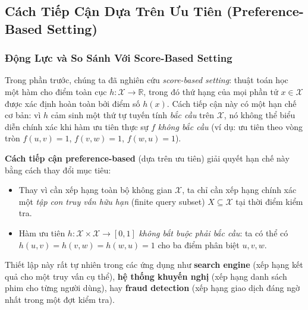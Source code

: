 
\subsection{Cách Tiếp Cận Dựa Trên Ưu Tiên (Preference-Based Setting)}
\label{sec:preference}

\subsubsection{Động Lực và So Sánh Với Score-Based Setting}

Trong phần trước, chúng ta đã nghiên cứu \emph{score-based setting}: thuật toán học một hàm cho điểm toàn cục $h : \mathcal{X} \to \mathbb{R}$, trong đó thứ hạng của mọi phần tử $x \in \mathcal{X}$ được xác định hoàn toàn bởi điểm số $h(x)$. Cách tiếp cận này có một hạn chế cơ bản: vì $h$ cảm sinh một thứ tự tuyến tính \emph{bắc cầu} trên $\mathcal{X}$, nó không thể biểu diễn chính xác khi hàm ưu tiên thực sự $f$ \emph{không bắc cầu} (ví dụ: ưu tiên theo vòng tròn $f(u,v)=1$, $f(v,w)=1$, $f(w,u)=1$).

\textbf{Cách tiếp cận preference-based} (dựa trên ưu tiên) giải quyết hạn chế này bằng cách thay đổi mục tiêu:
\begin{itemize}
    \item Thay vì cần xếp hạng toàn bộ không gian $\mathcal{X}$, ta chỉ cần xếp hạng chính xác một \emph{tập con truy vấn hữu hạn} (finite query subset) $X \subseteq \mathcal{X}$ tại thời điểm kiểm tra.
    \item Hàm ưu tiên $h : \mathcal{X} \times \mathcal{X} \to [0,1]$ \emph{không bắt buộc phải bắc cầu}: ta có thể có $h(u,v) = h(v,w) = h(w,u) = 1$ cho ba điểm phân biệt $u, v, w$.
\end{itemize}

Thiết lập này rất tự nhiên trong các ứng dụng như \textbf{search engine} (xếp hạng kết quả cho một truy vấn cụ thể), \textbf{hệ thống khuyến nghị} (xếp hạng danh sách phim cho từng người dùng), hay \textbf{fraud detection} (xếp hạng giao dịch đáng ngờ nhất trong một đợt kiểm tra).

